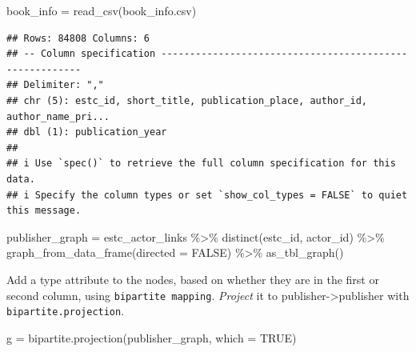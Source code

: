 \documentclass[
]{book}
\newenvironment{Shaded}{\begin{snugshade}}{\end{snugshade}}
\newcommand{\AttributeTok}[1]{\textcolor[rgb]{0.77,0.63,0.00}{#1}}
\newcommand{\ConstantTok}[1]{\textcolor[rgb]{0.00,0.00,0.00}{#1}}
\newcommand{\FunctionTok}[1]{\textcolor[rgb]{0.00,0.00,0.00}{#1}}
\newcommand{\NormalTok}[1]{#1}
\newcommand{\OtherTok}[1]{\textcolor[rgb]{0.56,0.35,0.01}{#1}}
\newcommand{\SpecialCharTok}[1]{\textcolor[rgb]{0.00,0.00,0.00}{#1}}
\newcommand{\StringTok}[1]{\textcolor[rgb]{0.31,0.60,0.02}{#1}}
\begin{document}
\begin{Shaded}
\begin{Highlighting}[]
\NormalTok{book\_info }\OtherTok{=} \FunctionTok{read\_csv}\NormalTok{(}\StringTok{\textquotesingle{}book\_info.csv\textquotesingle{}}\NormalTok{)}
\end{Highlighting}
\end{Shaded}

\begin{verbatim}
## Rows: 84808 Columns: 6
## -- Column specification --------------------------------------------------------
## Delimiter: ","
## chr (5): estc_id, short_title, publication_place, author_id, author_name_pri...
## dbl (1): publication_year
## 
## i Use `spec()` to retrieve the full column specification for this data.
## i Specify the column types or set `show_col_types = FALSE` to quiet this message.
\end{verbatim}

\begin{Shaded}
\begin{Highlighting}[]
\NormalTok{publisher\_graph }\OtherTok{=}\NormalTok{ estc\_actor\_links }\SpecialCharTok{\%\textgreater{}\%} \FunctionTok{distinct}\NormalTok{(estc\_id, actor\_id) }\SpecialCharTok{\%\textgreater{}\%} 
  \FunctionTok{graph\_from\_data\_frame}\NormalTok{(}\AttributeTok{directed =} \ConstantTok{FALSE}\NormalTok{) }\SpecialCharTok{\%\textgreater{}\%} \FunctionTok{as\_tbl\_graph}\NormalTok{()}
\end{Highlighting}
\end{Shaded}

Add a type attribute to the nodes, based on whether they are in the first or second column, using \texttt{bipartite\ mapping}. \emph{Project} it to publisher-\textgreater publisher with \texttt{bipartite.projection}.

\begin{Shaded}
\end{Shaded}

\begin{Shaded}
\begin{Highlighting}[]
\NormalTok{g }\OtherTok{=} \FunctionTok{bipartite.projection}\NormalTok{(publisher\_graph, }\AttributeTok{which =} \ConstantTok{TRUE}\NormalTok{)}
\end{Highlighting}
\end{Shaded}
\end{document}
